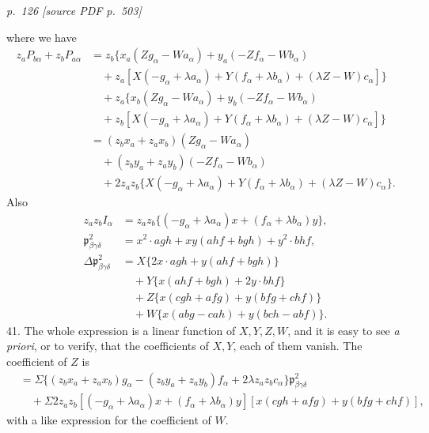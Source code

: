 \documentclass[11pt,a4paper]{article}
\newcommand{\sourcepage}[2]{%
  \bigskip
  \noindent\textit{p.~#1 [source PDF p.~#2]}%
  \par\smallskip
}
\newcommand{\p}{\mathfrak p}
\begin{document}
\sourcepage{126}{503}
where we have
\[
\begin{aligned}
z_aP_{b\alpha}+z_bP_{a\alpha}
&=z_b\{x_a(Zg_\alpha-Wa_\alpha)+y_a(-Zf_\alpha-Wb_\alpha)\\
&\quad +z_a[X(-g_\alpha+\lambda a_\alpha)
      +Y(f_\alpha+\lambda b_\alpha)+(\lambda Z-W)c_\alpha]\}\\
&\quad+z_a\{x_b(Zg_\alpha-Wa_\alpha)+y_b(-Zf_\alpha-Wb_\alpha)\\
&\quad +z_b[X(-g_\alpha+\lambda a_\alpha)
      +Y(f_\alpha+\lambda b_\alpha)+(\lambda Z-W)c_\alpha]\}\\
&=(z_bx_a+z_ax_b)(Zg_\alpha-Wa_\alpha)\\
&\quad +(z_by_a+z_ay_b)(-Zf_\alpha-Wb_\alpha)\\
&\quad +2z_az_b\{X(-g_\alpha+\lambda a_\alpha)
      +Y(f_\alpha+\lambda b_\alpha)+(\lambda Z-W)c_\alpha\}.
\end{aligned}
\]
Also
\[
\begin{aligned}
z_az_bI_\alpha&=z_az_b\{(-g_\alpha+\lambda a_\alpha)x
 +(f_\alpha+\lambda b_\alpha)y\},\\
\p^2_{\beta\gamma\delta}
&=x^2\cdot agh+xy(ahf+bgh)+y^2\cdot bhf,\\
\Delta\p^2_{\beta\gamma\delta}
&=X\{2x\cdot agh+y(ahf+bgh)\}\\
&\quad+Y\{x(ahf+bgh)+2y\cdot bhf\}\\
&\quad+Z\{x(cgh+afg)+y(bfg+chf)\}\\
&\quad+W\{x(abg-cah)+y(bch-abf)\}.
\end{aligned}
\]
41. The whole expression is a linear function of $X,Y,Z,W$, and it is easy to see
\textit{a priori}, or to verify, that the coefficients of $X,Y$, each of them vanish.
The coefficient of $Z$ is
\[
\begin{aligned}
&=\Sigma\{(z_bx_a+z_ax_b)g_\alpha-(z_by_a+z_ay_b)f_\alpha
       +2\lambda z_az_bc_\alpha\}\p^2_{\beta\gamma\delta}\\
&\quad+\Sigma 2z_az_b[(-g_\alpha+\lambda a_\alpha)x
       +(f_\alpha+\lambda b_\alpha)y]
       [x(cgh+afg)+y(bfg+chf)],
\end{aligned}
\]
with a like expression for the coefficient of $W$.
\end{document}
